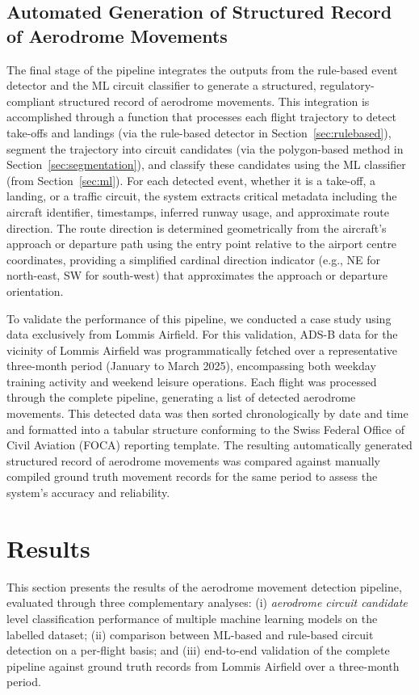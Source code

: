 \documentclass[
  manuscript=proceedings,  %
  layout=preprint,         %
  year=2025,
  volume=x,
]{extra/joas}
\begin{document}
\subsection{Automated Generation of Structured Record of Aerodrome Movements}
\label{sec:log}
The final stage of the pipeline integrates the outputs from the rule-based event detector and the ML circuit classifier to generate a structured, regulatory-compliant structured record of aerodrome movements. This integration is accomplished through a function that processes each flight trajectory to detect take-offs and landings (via the rule-based detector in Section~\ref{sec:rulebased}), segment the trajectory into circuit candidates (via the polygon-based method in Section~\ref{sec:segmentation}), and classify these candidates using the ML classifier (from Section~\ref{sec:ml}). For each detected event, whether it is a take-off, a landing, or a traffic circuit, the system extracts critical metadata including the aircraft identifier, timestamps, inferred runway usage, and approximate route direction. The route direction is determined geometrically from the aircraft's approach or departure path using the entry point relative to the airport centre coordinates, providing a simplified cardinal direction indicator (e.g., NE for north-east, SW for south-west) that approximates the approach or departure orientation.

To validate the performance of this pipeline, we conducted a case study using data exclusively from Lommis Airfield. For this validation, ADS-B data for the vicinity of Lommis Airfield was programmatically fetched over a representative three-month period (January to March 2025), encompassing both weekday training activity and weekend leisure operations. Each flight was processed through the complete pipeline, generating a list of detected aerodrome movements. This detected data was then sorted chronologically by date and time and formatted into a tabular structure conforming to the Swiss Federal Office of Civil Aviation (FOCA) reporting template. The resulting automatically generated structured record of aerodrome movements was compared against manually compiled ground truth movement records for the same period to assess the system's accuracy and reliability.

\section{Results}
\label{sec:results}
This section presents the results of the aerodrome movement detection pipeline, evaluated through three complementary analyses: (i) \textit{aerodrome circuit candidate} level classification performance of multiple machine learning models on the labelled dataset; (ii) comparison between ML-based and rule-based circuit detection on a per-flight basis; and (iii) end-to-end validation of the complete pipeline against ground truth records from Lommis Airfield over a three-month period.
\end{document}
